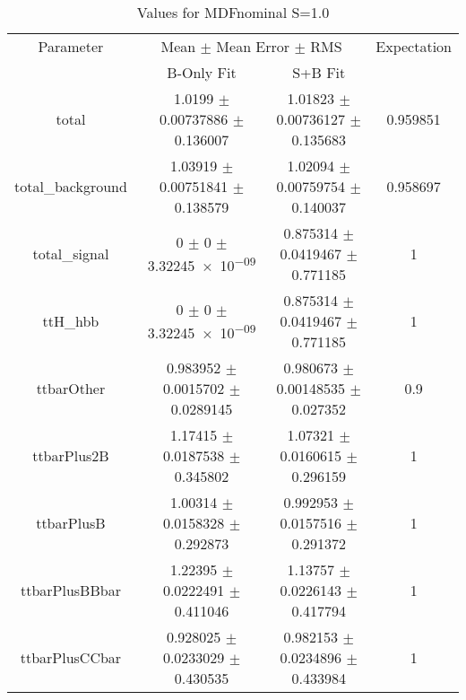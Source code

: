 \begin{table}
\centering
\caption{Values for MDFnominal S=1.0}
\begin{tabular}{cccc}
\toprule
Parameter & \multicolumn{2}{c}{Mean $\pm$ Mean Error $\pm$ RMS} & Expectation\\
 & B-Only Fit & S+B Fit & \\
\midrule
total & \num{1.0199} $\pm$ \num{0.00737886} $\pm$ \num{0.136007} & \num{1.01823} $\pm$ \num{0.00736127} $\pm$ \num{0.135683} & \num{0.959851}\\
total\_background & \num{1.03919} $\pm$ \num{0.00751841} $\pm$ \num{0.138579} & \num{1.02094} $\pm$ \num{0.00759754} $\pm$ \num{0.140037} & \num{0.958697}\\
total\_signal & \num{0} $\pm$ \num{0} $\pm$ \num{3.32245e-09} & \num{0.875314} $\pm$ \num{0.0419467} $\pm$ \num{0.771185} & \num{1}\\
ttH\_hbb & \num{0} $\pm$ \num{0} $\pm$ \num{3.32245e-09} & \num{0.875314} $\pm$ \num{0.0419467} $\pm$ \num{0.771185} & \num{1}\\
ttbarOther & \num{0.983952} $\pm$ \num{0.0015702} $\pm$ \num{0.0289145} & \num{0.980673} $\pm$ \num{0.00148535} $\pm$ \num{0.027352} & \num{0.9}\\
ttbarPlus2B & \num{1.17415} $\pm$ \num{0.0187538} $\pm$ \num{0.345802} & \num{1.07321} $\pm$ \num{0.0160615} $\pm$ \num{0.296159} & \num{1}\\
ttbarPlusB & \num{1.00314} $\pm$ \num{0.0158328} $\pm$ \num{0.292873} & \num{0.992953} $\pm$ \num{0.0157516} $\pm$ \num{0.291372} & \num{1}\\
ttbarPlusBBbar & \num{1.22395} $\pm$ \num{0.0222491} $\pm$ \num{0.411046} & \num{1.13757} $\pm$ \num{0.0226143} $\pm$ \num{0.417794} & \num{1}\\
ttbarPlusCCbar & \num{0.928025} $\pm$ \num{0.0233029} $\pm$ \num{0.430535} & \num{0.982153} $\pm$ \num{0.0234896} $\pm$ \num{0.433984} & \num{1}\\
\bottomrule
\end{tabular}
\end{table}
